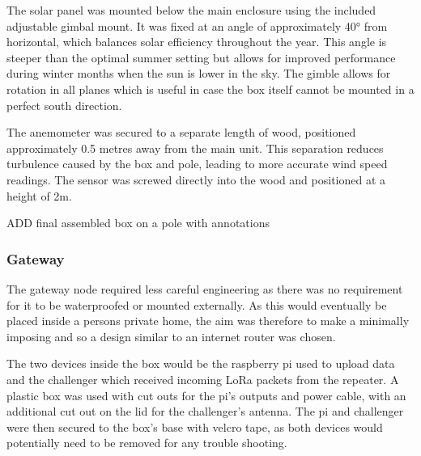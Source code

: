 The solar panel was mounted below the main enclosure using the included
adjustable gimbal mount. It was fixed at an angle of approximately 40° from
horizontal, which balances solar efficiency throughout the year. This angle is
steeper than the optimal summer setting but allows for improved performance
during winter months when the sun is lower in the sky. The gimble allows for
rotation in all planes which is useful in case the box itself cannot be mounted
in a perfect south direction.

The anemometer was secured to a separate length of wood, positioned
approximately 0.5 metres away from the main unit. This separation reduces
turbulence caused by the box and pole, leading to more accurate wind speed
readings. The sensor was screwed directly into the wood and positioned at a
height of 2m.

ADD final assembled box on a pole with annotations

\subsubsection{Gateway}

The gateway node required less careful engineering as there was no requirement
for it to be waterproofed or mounted externally. As this would eventually be
placed inside a persons private home, the aim was therefore to make a minimally
imposing and so a design similar to an internet router was chosen.

The two devices inside the box would be the raspberry pi used to upload data and
the challenger which received incoming LoRa packets from the repeater. A plastic
box was used with cut outs for the pi's outputs and power cable, with an
additional cut out on the lid for the challenger's antenna. The pi and
challenger were then secured to the box's base with velcro tape, as both devices
would potentially need to be removed for any trouble shooting.
